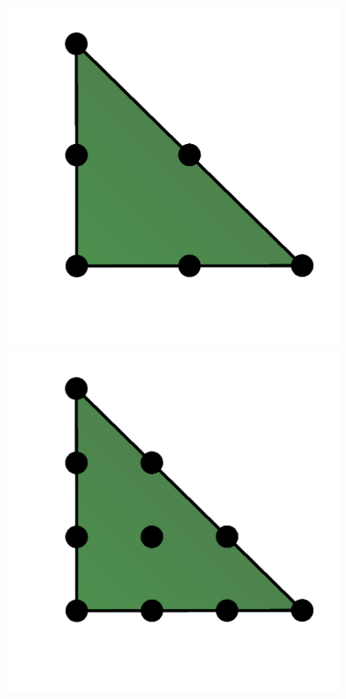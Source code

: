 \begin{figure}
\begin{center}
    \includegraphics[width=\elmfigsizequadruple]{chapters/kirby-6/png/DG2_2d.png}
    \includegraphics[width=\elmfigsizequadruple]{chapters/kirby-6/png/DG3_2d.png} \\

\end{center}
\end{figure}
